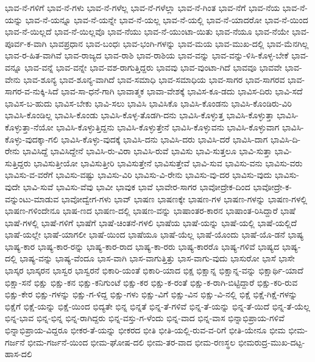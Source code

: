 {ಭಾವ-ನೆ-ಗಳಿಗೆ
ಭಾವ-ನೆ-ಗಳು
ಭಾವ-ನೆ-ಗಳೆಲ್ಲ
ಭಾವ-ನೆ-ಗಳೆಲ್ಲಾ
ಭಾವ-ನೆ-ಗಿಂತ
ಭಾವ-ನೆಗೆ
ಭಾವ-ನೆಯ
ಭಾವ-ನೆ-ಯನ್ನು
ಭಾವ-ನೆ-ಯನ್ನೂ
ಭಾವ-ನೆ-ಯನ್ನೇ
ಭಾವ-ನೆ-ಯಲ್ಲ
ಭಾವ-ನೆ-ಯಲ್ಲಿ
ಭಾವ-ನೆ-ಯಾದರೋ
ಭಾವ-ನೆ-ಯಿಂದ
ಭಾವ-ನೆ-ಯಿಲ್ಲದೆ
ಭಾವ-ನೆ-ಯಿಲ್ಲವೊ
ಭಾವ-ನೆಯು
ಭಾವ-ನೆ-ಯುಂಟಾ-ಯಿತು
ಭಾವ-ನೆಯೂ
ಭಾವ-ನೆಯೇ
ಭಾವ-ಪೂರ್ವ-ಕ-ವಾಗಿ
ಭಾವಪ್ರಧಾನ
ಭಾವ-ಬಂಧಃ
ಭಾವ-ಭಂಗಿ-ಗಳನ್ನು
ಭಾವ-ಮಯ
ಭಾವ-ಮುಖ-ದಲ್ಲಿ
ಭಾವ-ಮೆನಗಿಲ್ಲ
ಭಾವ-ರ-ಹಿತ-ವಾಗಿವೆ
ಭಾವ-ರಾಜ್ಯದ
ಭಾವ-ರಾಶಿ
ಭಾವ-ರಾಶಿಯ
ಭಾವ-ವನ್ನು
ಭಾವ-ವನ್ನು-ಳಿಸಿ-ಕೊಳ್ಳ-ಬೇಕೆ
ಭಾವ-ವನ್ನೂ
ಭಾವ-ವನ್ನೆ
ಭಾವ-ವನ್ನೇ
ಭಾವ-ವಶ-ರಾಗುತ್ತಿದ್ದರು
ಭಾವವು
ಭಾವ-ವುಂಟಾ-ಗಿದೆ
ಭಾವವೂ
ಭಾವವೇ
ಭಾವ-ವೇನು
ಭಾವ-ಶೂನ್ಯ
ಭಾವ-ಶೂನ್ಯ-ವಾಗಿದೆ
ಭಾವ-ಸಮಾಧಿ
ಭಾವ-ಸಮಾಧಿಯ
ಭಾವ-ಸಾಗರ
ಭಾವ-ಸಾಗರವ
ಭಾವ-ಸಾಗರ-ವ-ನುಕ್ಕಿ-ಸಿದೆ
ಭಾವ-ಸಾ-ಧನೆ-ಗಾಗಿ
ಭಾವಾತ್ಮಕ
ಭಾವಾ-ವೇಶಕ್ಕೆ
ಭಾವಿಸ-ಕೂ-ಡದು
ಭಾವಿಸ-ದಿರು
ಭಾವಿ-ಸದೆ
ಭಾವಿಸ-ಬ-ಹುದು
ಭಾವಿಸ-ಬೇಕು
ಭಾವಿ-ಸಲು
ಭಾವಿಸಿ
ಭಾವಿಸಿಕೊ
ಭಾವಿಸಿ-ಕೊಂಡನು
ಭಾವಿಸಿ-ಕೊಂಡಿರು-ವಿರಿ
ಭಾವಿಸಿ-ಕೊಂಡಿಲ್ಲ
ಭಾವಿಸಿ-ಕೊಂಡು
ಭಾವಿಸಿ-ಕೊಳ್ಳ-ತೊಡಗಿ-ದನು
ಭಾವಿಸಿ-ಕೊಳ್ಳುತ್ತ
ಭಾವಿಸಿ-ಕೊಳ್ಳುತ್ತಾ
ಭಾವಿಸಿ-ಕೊಳ್ಳುತ್ತಾ-ನೆಯೋ
ಭಾವಿಸಿ-ಕೊಳ್ಳುತ್ತಿದ್ದನು
ಭಾವಿಸಿ-ಕೊಳ್ಳುತ್ತೇನೆ
ಭಾವಿಸಿ-ಕೊಳ್ಳುವನು
ಭಾವಿಸಿ-ಕೊಳ್ಳುವಾಗ
ಭಾವಿಸಿ-ಕೊಳ್ಳು-ವುದಕ್ಕಾ-ಗಲಿ
ಭಾವಿಸಿ-ಕೊಳ್ಳು-ವುದಕ್ಕೆ
ಭಾವಿಸಿ-ದನು
ಭಾವಿಸಿ-ದರು
ಭಾವಿಸಿ-ದರೆ
ಭಾವಿಸಿ-ದಾಗ
ಭಾವಿಸಿ-ದಿ-ರೇನು
ಭಾವಿಸಿದ್ದೆ
ಭಾವಿಸಿದ್ದೇನೆ
ಭಾವಿಸಿ-ರು-ವಿರಾ
ಭಾವಿಸಿ-ರುವೆ
ಭಾವಿಸು
ಭಾವಿ-ಸುತ್ತಲೂ
ಭಾವಿ-ಸುತ್ತಾ
ಭಾವಿ-ಸುತ್ತಿದ್ದರು
ಭಾವಿಸುತ್ತೀಯೋ
ಭಾವಿಸುತ್ತೀರಿ
ಭಾವಿಸುತ್ತೇನೆ
ಭಾವಿಸುತ್ತೇವೆ
ಭಾವಿ-ಸುವ
ಭಾವಿಸು-ವನು
ಭಾವಿಸು-ವರು
ಭಾವಿಸು-ವ-ವರೆಗೆ
ಭಾವಿಸು-ವಷ್ಟು
ಭಾವಿಸು-ವಿರಿ
ಭಾವಿಸು-ವಿ-ರೇನು
ಭಾವಿಸು-ವು-ದರ
ಭಾವಿಸು-ವುದು
ಭಾವಿಸು-ವುದೇ
ಭಾವಿ-ಸುವೆ
ಭಾವಿಸು-ವೆವು
ಭಾವೀ
ಭಾವುಕ
ಭಾವೆ
ಭಾವೇರ-ಸಾಗರ
ಭಾವೋದ್ರೇಕ-ದಿಂದ
ಭಾವೋದ್ರೇ-ಕ-ವನ್ನುಂಟು-ಮಾಡುವ
ಭಾವೋದ್ವೇಗ-ಗಳು
ಭಾವ್
ಭಾಷಣ
ಭಾಷಣಕ್ಕೇ
ಭಾಷಣ-ಗಳ
ಭಾಷಣ-ಗಳನ್ನು
ಭಾಷಣ-ಗಳಲ್ಲಿ
ಭಾಷಣ-ಗಳಿಂದೇನೂ
ಭಾಷ-ಣದ
ಭಾಷಣ-ದಲ್ಲಿ
ಭಾಷಣ-ವನ್ನು
ಭಾಷಾಂತರ-ಕಾರನ
ಭಾಷಾಂತ-ರಿಸಿದ್ದಾರೆ
ಭಾಷೆ
ಭಾಷೆ-ಗಳಲ್ಲಿ
ಭಾಷೆ-ಗಳಿಗೆ
ಭಾಷೆಗೆ
ಭಾಷೆ-ಚಿಂತನೆ-ಗಳಲಿ
ಭಾಷೆಯ
ಭಾಷೆ-ಯನ್ನು
ಭಾಷೆ-ಯಲ್ಲಿ
ಭಾಷೆ-ಯಲ್ಲಿದೆ
ಭಾಷೆ-ಯಲ್ಲೇ
ಭಾಷೆ-ಯಾಗಲೀ
ಭಾಷೆ-ಯಿಂದ
ಭಾಷೆಯೂ
ಭಾಷೆ-ಯೆಲ್ಲ
ಭಾಷೆ-ಯೊಂದು
ಭಾಷೆ-ಯೊ-ಡನೆ
ಭಾಷ್ಯ
ಭಾಷ್ಯ-ಕಾರ
ಭಾಷ್ಯ-ಕಾರ-ರನ್ನು
ಭಾಷ್ಯ-ಕಾರ-ರಾದ
ಭಾಷ್ಯ-ಕಾ-ರರು
ಭಾಷ್ಯ-ಕಾರರೊ
ಭಾಷ್ಯ-ಗಳಿವೆ
ಭಾಷ್ಯದ
ಭಾಷ್ಯ-ದಲ್ಲಿ
ಭಾಷ್ಯ-ವನ್ನು
ಭಾಷ್ಯ-ವೆಂದೂ
ಭಾಸ-ವಾಗಿ
ಭಾಸ-ವಾಗುತ್ತಿತ್ತು
ಭಾಸ-ವಾಗು-ವುದು
ಭಾಸುರೋ
ಭಾಸೆ
ಭಾಸೇ
ಭಾಸ್ಕರ
ಭಾಸ್ಕರನ
ಭಾಸ್ವರ
ಭಾಸ್ವರನೆ
ಭಿಕಾರಿ-ಯಂತೆ
ಭಿಕಾರಿ-ಯಾದ
ಭಿಕ್ಷ
ಭಿಕ್ಷಾನ್ನ
ಭಿಕ್ಷಾನ್ನ-ವನ್ನು
ಭಿಕ್ಷಾರ್ಥಿ-ಯಾದೆ
ಭಿಕ್ಷಾ-ಸನೆ
ಭಿಕ್ಷು
ಭಿಕ್ಷು-ಕನ
ಭಿಕ್ಷು-ಕನಿಗುಂಟೆ
ಭಿಕ್ಷು-ಕರ
ಭಿಕ್ಷು-ಕ-ರಂತೆ
ಭಿಕ್ಷು-ಕ-ರಾಗಿ-ಬಿಟ್ಟಿದ್ದಾರೆ
ಭಿಕ್ಷು-ಕರಿ-ರುವ
ಭಿಕ್ಷು-ಕೇರ
ಭಿಕ್ಷು-ಗಳನ್ನು
ಭಿಕ್ಷು-ಗ-ಳಿದ್ದ
ಭಿಕ್ಷು-ಗಳು
ಭಿಕ್ಷು-ವಿಗೆ
ಭಿಕ್ಷು-ವಿನ
ಭಿಕ್ಷು-ವಿ-ನಲ್ಲಿ
ಭಿಕ್ಷೆ
ಭಿಕ್ಷೆ-ಗಿಕ್ಷೆ-ಗಳನ್ನು
ಭಿಕ್ಷೆಗೆ
ಭಿಕ್ಷೆ-ಯನ್ನು
ಭಿಕ್ಷೆ-ಯಿಂದ
ಭಿದ್ಯತೇ
ಭಿನ್ನ
ಭಿನ್ನತೆ
ಭಿನ್ನ-ತೆ-ಗಳಿವೆ
ಭಿನ್ನ-ತೆ-ಯನ್ನು
ಭಿನ್ನ-ತೆ-ಯಿದೆ
ಭಿನ್ನ-ತೆ-ಯೆಲ್ಲ
ಭಿನ್ನ-ಭಾವ
ಭಿನ್ನ-ಭಿನ್ನ
ಭಿನ್ನ-ರಾಗಿದ್ದರು
ಭಿನ್ನ-ವಸ್ತು-ಗ-ಳೆಂದು
ಭಿನ್ನ-ವಾದ
ಭಿನ್ನ-ವಾಸ
ಭಿನ್ನಾಭಿಪ್ರಾಯ-ಗಳಿವೆ
ಭಿನ್ನಾಭಿಪ್ರಾಯ-ವಿದ್ದರೂ
ಭೀಕರ-ತೆ-ಯನ್ನು
ಭೀಕರದ
ಭೀತಿ
ಭೀತಿ-ಯಲ್ಲಿ-ರುವ-ವ-ರಿಗೆ
ಭೀತಿ-ಯೇನೂ
ಭೀಮ
ಭೀಮ-ಗರ್ಜನೆ
ಭೀಮ-ಗರ್ಜನೆ-ಯಿಂದ
ಭೀಮ-ಘೋಷ-ದಲಿ
ಭೀಮ-ತರ-ವಾದ
ಭೀಮ-ರಣಸ್ಥಲ
ಭೀಮರುದ್ರ-ಮುಖ-ದಟ್ಟ-ಹಾಸ-ದಲಿ
}
